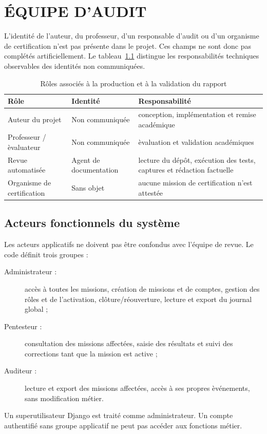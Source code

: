 \chapter{\'EQUIPE D'AUDIT}

L'identit\'e de l'auteur, du professeur, d'un responsable d'audit ou d'un organisme de certification n'est pas pr\'esente dans le projet. Ces champs ne sont donc pas compl\'et\'es artificiellement. Le tableau~\ref{tab:roles-review} distingue les responsabilit\'es techniques observables des identit\'es non communiqu\'ees.

\begin{table}[H]
\centering
\caption{R\^oles associ\'es \`a la production et \`a la validation du rapport}\label{tab:roles-review}
\begin{tabularx}{\textwidth}{p{4.4cm}p{4cm}X}
\toprule
\rowcolor{AuditLight}R\^ole & Identit\'e & Responsabilit\'e\\
\midrule
Auteur du projet & Non communiqu\'ee & conception, impl\'ementation et remise acad\'emique\\
Professeur / \`evaluateur & Non communiqu\'ee & \`evaluation et validation acad\'emiques\\
Revue automatis\'ee & Agent de documentation & lecture du d\'ep\^ot, ex\'ecution des tests, captures et r\'edaction factuelle\\
Organisme de certification & Sans objet & aucune mission de certification n'est attest\'ee\\
\bottomrule
\end{tabularx}
\end{table}

\section*{Acteurs fonctionnels du syst\`eme}
Les acteurs applicatifs ne doivent pas \^etre confondus avec l'\'equipe de revue. Le code d\'efinit trois groupes :
\begin{description}
  \item[Administrateur :] acc\`es \`a toutes les missions, cr\'eation de missions et de comptes, gestion des r\^oles et de l'activation, cl\^oture/r\'eouverture, lecture et export du journal global ;
  \item[Pentesteur :] consultation des missions affect\'ees, saisie des r\'esultats et suivi des corrections tant que la mission est active ;
  \item[Auditeur :] lecture et export des missions affect\'ees, acc\`es \`a ses propres \`ev\'enements, sans modification m\'etier.
\end{description}
Un superutilisateur Django est trait\'e comme administrateur. Un compte authentifi\'e sans groupe applicatif ne peut pas acc\'eder aux fonctions m\'etier.

